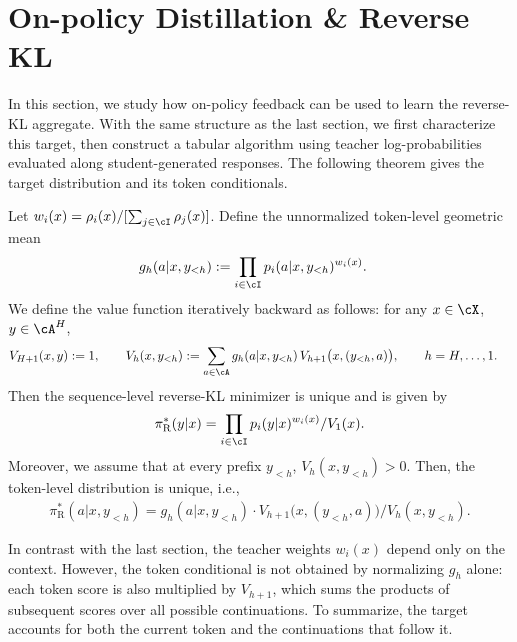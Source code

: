 \documentclass[11pt]{article}
\newcommand{\pir}{\pi_{\mathrm{R}}}
\begin{document}
\section{On-policy Distillation \& Reverse KL}
\label{sec:ar-rkl-tabular}
In this section, we study how on-policy feedback can be used to learn the reverse-KL aggregate. With the same structure as the last section, we first characterize this target, then construct a tabular algorithm using teacher log-probabilities evaluated along student-generated responses. The following theorem gives the target distribution and its token conditionals.
\begin{theorem}[Reverse KL] 
\label{thm:obj-reverse-kl}
Let $w_i(x) = \rho_i(x)/[\sum_{j \in \cI} \rho_j(x)]$. Define the unnormalized token-level geometric mean
    \begin{align*}
        g_h(a|x,y_{<h}) &:= \prod_{i \in \cI} p_i(a|x,y_{<h})^{w_i(x)}.
    \end{align*}
We define the value function iteratively backward as follows: for any $x \in \cX$, $y \in \cA^H$,
\begin{align*}
    V_{H+1}(x,y) := 1, \qquad V_h(x,y_{<h}) &:= \sum_{a \in \cA} g_h(a|x,y_{<h})\, V_{h+1}\big(x,(y_{<h},a)\big), \qquad h = H,\ldots,1.
\end{align*}
Then the sequence-level reverse-KL minimizer is unique and is given by
\begin{align}
    \label{eq:seq-rkl}
    \pir^*(y|x)
    =
        \prod_{i\in\cI}  p_i(y|x)^{w_i(x)}/
        V_1(x)
    .
\end{align}
Moreover, we assume that at every prefix $y_{<h}$, $V_h(x,y_{<h})>0$. Then, the token-level distribution is unique, i.e., 
\begin{align}
\label{eq:ar-rkl}
    \pir^*(a|x,y_{<h}) = g_h(a|x,y_{<h})\cdot V_{h+1}\big(x,(y_{<h},a)\big)/V_h(x,y_{<h}).
\end{align}
\end{theorem}
\begin{remark}
In contrast with the last section, the teacher weights $w_i(x)$ depend only on the context. However, the token conditional is not obtained by normalizing $g_h$ alone: each token score is also multiplied by $V_{h+1}$, which sums the products of subsequent scores over all possible continuations. To summarize, the target accounts for both the current token and the continuations that follow it.
\end{remark}
\end{document}
